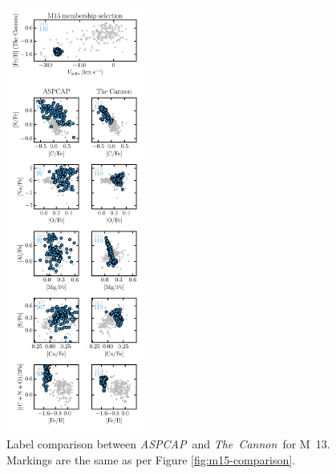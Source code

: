 \documentclass[12pt,preprint]{aastex}
\newcommand{\project}[1]{\textsl{#1}}
\newcommand{\TheCannon}{\project{The~Cannon}}
\newcommand{\acronym}[1]{{\small{#1}}}
\newcommand{\aspcap}{\project{\acronym{ASPCAP}}}
\begin{document}
\begin{figure}[p]
\includegraphics[width=0.4\textwidth]{M13_comparison.pdf}
\caption{Label comparison between \aspcap\ and \TheCannon\ for M~13.
Markings are the same as per Figure \ref{fig:m15-comparison}.
\label{fig:m13-comparison}}
\end{figure}

\clearpage
\end{document}
